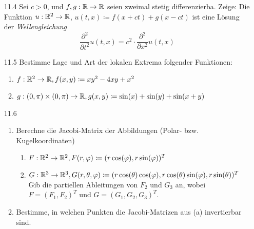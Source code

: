 \documentclass{../HM}
\begin{document}
\begin{enumerate}
\begin{enumerate}
		\end{enumerate}
		\item[11.4] Sei $c>0$, und $f,g: \mathbb{R} \to \mathbb{R}$ seien zweimal stetig differenzierba. Zeige: Die Funktion $u: \mathbb{R}^2 \to \mathbb{R}$, $u(t,x)\coloneqq f(x+ct)+g(x-ct)$ ist eine Lösung der \textit{Wellengleichung}
		$$\frac{\partial^2}{\partial t^2}u(t,x)=c^2\cdot \frac{\partial^2}{\partial x^2}u(t,x)$$
		\item[11.5] Bestimme Lage und Art der lokalen Extrema folgender Funktionen:
		\begin{enumerate}
			\item $f:\mathbb{R}^2 \to \mathbb{R}, f(x,y)\coloneqq xy^2-4xy+x^2$
			\item $g:(0,\pi)\times(0,\pi)\to \mathbb{R}, g(x,y) \coloneqq \sin(x) + \sin(y) + \sin(x+y)$
		\end{enumerate}
		\item[11.6]
		\begin{enumerate}
			\item Berechne die Jacobi-Matrix der Abbildungen (Polar- bzw. Kugelkoordinaten)
			\begin{enumerate}
				\item $F:\mathbb{R}^2 \to \mathbb{R}^2,F(r,\varphi)\coloneqq(r \cos(\varphi), r\sin(\varphi))^T$
				\item $G: \mathbb{R}^3 \to \mathbb{R}^3, G(r, \theta, \varphi)\coloneqq(r \cos(\theta) \cos(\varphi), r\cos(\theta)\sin(\varphi),r\sin(\theta))^T$\\
				Gib die partiellen Ableitungen von $F_2$ und $G_3$ an, wobei $F = (F_1 , F_2 )^T$ und $G = (G_1 , G_2 , G_3 )^T$.
			\end{enumerate}
		\item Bestimme, in welchen Punkten die Jacobi-Matrizen aus (a) invertierbar sind.
		\end{enumerate}

	\end{enumerate}
\end{document}
